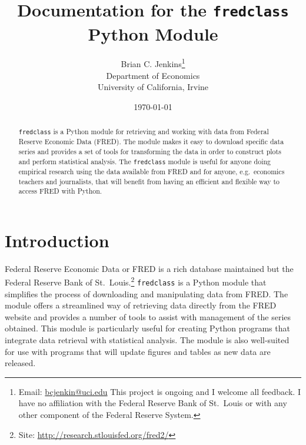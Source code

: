 \documentclass[11pt,fleqn]{article}
\newcommand{\ttt}{\texttt}
\begin{document}
\begin{titlepage}
\title{Documentation for the \ttt{fredclass} Python Module}
\author{Brian C. Jenkins\thanks{Email: \href{mailto:bcjenkin@uci.edu}{bcjenkin@uci.edu} This project is ongoing and I welcome all feedback. I have no affiliation with the Federal Reserve Bank of St.~Louis or with any other component of the Federal Reserve System.}\\Department of Economics \\University of California, Irvine}
\date{\today}

\maketitle

\begin{abstract}
\noindent \ttt{fredclass} is a Python module for retrieving and working with data from Federal Reserve Economic Data (FRED). The module makes it easy to download specific data series and provides a set of tools for transforming the data in order to construct plots and perform statistical analysis. The \ttt{fredclass} module is useful for anyone doing empirical research using the data available from FRED and for anyone, e.g.~economics teachers and journalists, that will benefit from having an efficient and flexible way to access FRED with Python.
\end{abstract}

\thispagestyle{empty}
\end{titlepage}

\tableofcontents

\newpage

\section{Introduction}

Federal Reserve Economic Data or FRED is a rich database maintained but the Federal Reserve Bank of St.~Louis.\footnote{Site: \href{http://research.stlouisfed.org/fred2/}{http://research.stlouisfed.org/fred2/}} \verb=fredclass= is a Python module that simplifies the process of downloading and manipulating data from FRED. The module offers a streamlined way of retrieving data directly from the FRED website and provides a number of tools to assist with management of the series obtained. This module is particularly useful for creating Python programs that integrate data retrieval with statistical analysis. The module is also well-suited for use with programs that will update figures and tables as new data are released.
\end{document}
